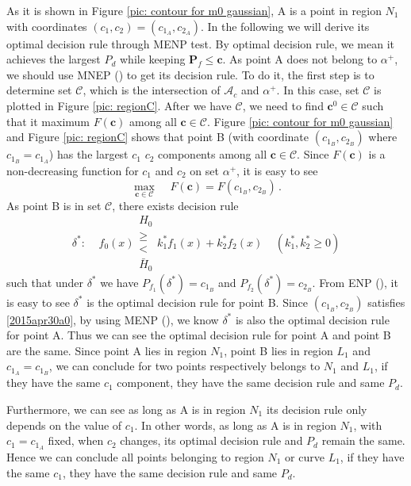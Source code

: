 As it is shown in Figure \ref{pic: contour for m0 gaussian}, A is a point in region ${N}_1$ with coordinates $(c_1, c_2) = (c_{1_A}, c_{2_A})$. In the following we will derive its optimal decision rule through MENP test. By optimal decision rule, we mean   it achieves the largest $P_d$ while keeping $\mathbf{P}_f \leq \mathbf{c}$.  
As point A does not belong to $\alpha^+$, we should use MNEP () to get its decision rule. To do it, the first step is to determine set $\mathcal{C}$, which is the intersection of $\mathcal{A}_c$ and $\alpha^+$. In this case, set $\mathcal{C}$ is plotted in Figure \ref{pic: regionC}.
After we have $\mathcal{C}$, we need to find $\mathbf{c}^0 \in \mathcal{C}$ such that it maximum $F(\mathbf{c})$ among all $\mathbf{c} \in \mathcal{C}$.
Figure \ref{pic: contour for m0 gaussian} and Figure \ref{pic: regionC} shows that point B (with coordinate $(c_{1_B}, c_{2_B})$ where $c_{1_B} = c_{1_A}$) has the largest $c_1$ $c_2$ components among all $\mathbf{c} \in \mathcal{C}$. Since $F(\mathbf{c})$ is a non-decreasing function for $c_1$ and $c_2$ on set $\alpha^+$, it is easy to see
\begin{equation}
  \max_{\mathbf{c} \in \mathcal{C}}\;\;\;\;F(\mathbf{c}) = F(c_{1_B}, c_{2_B})\,.
  \label{2015apr30a0}
\end{equation}
 As point B is in set $\mathcal{C}$, there exists decision rule
 \[
\delta^\ast:\;\;\;\;f_0(x) \substack{H_0 \\ \geq \\ < \\ \bar{H}_0} k_1^\ast f_1(x) + k_2^\ast f_2(x) \;\;\;\;(k_1^\ast, k_2^\ast \geq 0)
 \]
 such that under $\delta^\ast$ we have  $P_{f_1}(\delta^\ast) = c_{1_B}$ and  $P_{f_2}(\delta^\ast) = c_{2_B}$. 
 From ENP (), it is easy to see $\delta^\ast$ is the optimal decision rule for point B.
 Since $(c_{1_B}, c_{2_B})$ satisfies \eqref{2015apr30a0}, by using MENP (), we know $\delta^\ast$ is also the optimal decision rule for point A. Thus we can see the optimal decision rule for point A and point B are the same. Since point A lies in region $N_1$, point B lies in region $L_1$ and $c_{1_A} = c_{1_B}$, we can conclude for two points respectively belongs to $N_1$ and $L_1$, if they have the same $c_1$ component, they have the same decision rule and same $P_d$. 

Furthermore, we can see as long as A is in region $N_1$ its decision rule only depends on the value of $c_{1}$.  In other words, as long as A is in region $N_1$, with $c_1 = c_{1_A}$ fixed,  when $c_{2}$ changes, its optimal decision rule and $P_d$ remain the same. Hence we can conclude all points belonging to region $N_1$ or curve $L_1$, if they have the same $c_1$, they have the same decision rule and same $P_d$.

